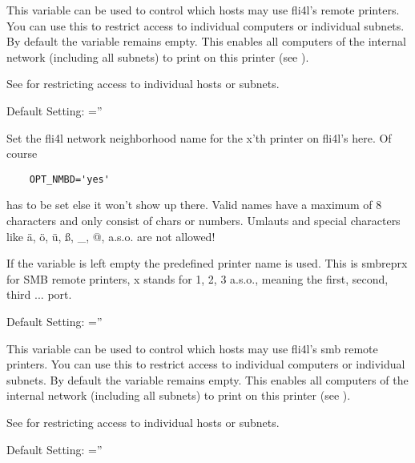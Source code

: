 \begin{description}
    This variable can be used to control which hosts may use fli4l's remote
    printers. You can use this to restrict access
    to individual computers or individual subnets. By default the variable remains empty.
    This enables all computers of the internal network (including all subnets) to print
    on this printer (see ).

    See  for restricting
    access to individual hosts or subnets.

    Default Setting: =''



    Set the fli4l network neighborhood name for the x'th printer on fli4l's
     here. Of course

\begin{example}
\begin{verbatim}
    OPT_NMBD='yes'
\end{verbatim}
\end{example}

    has to be set else it won't show up there. Valid names have a maximum of 8 characters
    and only consist of chars or numbers. Umlauts and special characters like ä, ö, ü,
    ß, \_, @, a.s.o. are not allowed!

    If the variable is left empty the predefined printer name is used. This is
    smbreprx for SMB remote printers, x stands for 1, 2, 3 a.s.o., meaning the
    first, second, third ... port.

    Default Setting: =''



    This variable can be used to control which hosts may use fli4l's smb remote
    printers. You can use this to restrict access
    to individual computers or individual subnets. By default the variable remains empty.
    This enables all computers of the internal network (including all subnets) to print
    on this printer (see ).

    See  for restricting
    access to individual hosts or subnets.

    Default Setting: =''

\end{description}

